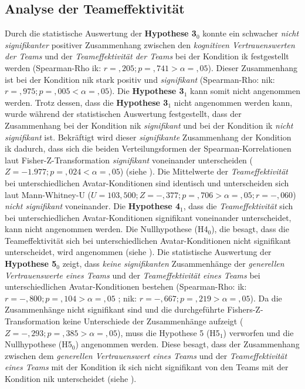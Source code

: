 \documentclass[a4paper,11pt]{article}%
\renewcommand{\\}{\vspace*{0.5\baselineskip} \newline}
\begin{document}
{%

\subsection{Analyse der Teameffektivität}
\label{AnalyseTE}
Durch die statistische Auswertung der \textbf{Hypothese 3$_{0}$} konnte ein schwacher \textit{nicht signifikanter} positiver Zusammenhang zwischen den \textit{kognitiven Vertrauenswerten der Teams} und der \textit{Teameffektivität der Teams} bei der Kondition \ac{ik} festgestellt werden (Spearman-Rho \ac{ik}: $r =,205; p =,741 > \alpha = ,05$). Dieser Zusammenhang ist bei der Kondition \ac{nik} stark positiv und \textit{signifikant} (Spearman-Rho: \ac{nik}: $r =,975; p =,005 < \alpha = ,05$). Die \textbf{Hypothese 3$_{1}$} kann somit nicht angenommen werden.\newline
Trotz dessen, dass die \textbf{Hypothese 3$_{1}$} nicht angenommen werden kann, wurde während der statistischen Auswertung festgestellt, dass der Zusammenhang bei der Kondition \ac{nik} \textit{signifikant} und bei der Kondition \ac{ik} \textit{nicht signifikant} ist. Bekräftigt wird dieser \textit{signifikante} Zusammenhang der Kondition \ac{ik} dadurch, dass sich die beiden Verteilungsformen der Spearman-Korrelationen laut Fisher-Z-Transformation \textit{signifikant} voneinander unterscheiden ($Z=-1.977 ;p =,024 < \alpha = ,05$) (siehe ).\\
Die Mittelwerte der \textit{Teameffektivität} bei unterschiedlichen Avatar-Konditionen sind identisch und unterscheiden sich laut Mann-Whitney-U ($U = 103,500; Z = -,377; p =,706 > \alpha = ,05; r = -,060$) \textit{nicht signifikant} voneinander. Die \textbf{Hypothese 4$_{1}$}, dass die \textit{Teameffektivität} sich bei unterschiedlichen Avatar-Konditionen signifikant voneinander unterscheidet, kann nicht angenommen werden. Die Nullhypothese (H4$_{0}$), die besagt, dass die Teameffektivität sich bei unterschiedlichen Avatar-Konditionen nicht signifikant unterscheidet, wird angenommen (siehe ).\\
Die statistische Auswertung der \textbf{Hypothese 5$_{0}$} zeigt, dass \textit{keine signifikanten} Zusammenhänge der \textit{generellen Vertrauenswerte eines Teams} und der \textit{Teameffektivität eines Teams} bei unterschiedlichen Avatar-Konditionen bestehen (Spearman-Rho: \ac{ik}: $r = -,800; p =,104 > \alpha = ,05$ ; \ac{nik}: $r = -,667; p =,219 > \alpha = ,05$). Da die Zusammenhänge nicht signifikant sind und die durchgeführte Fishers-Z-Transformation keine Unterschiede der Zusammenhänge aufzeigt ($Z=-,293; p =,385 > \alpha = ,05$), muss die Hypothese 5 {(H5$_{1}$) verworfen und die Nullhypothese (H5$_{0}$) angenommen werden. Diese besagt, dass der Zusammenhang zwischen dem \textit{generellen Vertrauenswert eines Teams} und der \textit{Teameffektivität eines Teams} mit der Kondition \ac{ik} sich nicht signifikant von den Teams mit der Kondition \ac{nik} unterscheidet (siehe ).
}}
\end{document}
